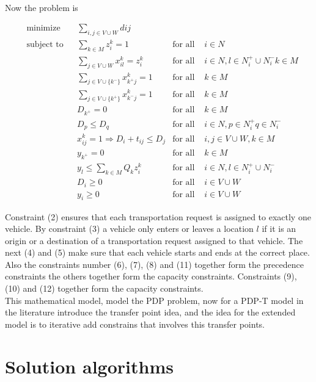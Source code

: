 \documentclass[10pt,twoside]{article}
\begin{document}
\citep{Parragh2008} \\

\vspace{1cm}
Now the problem is

\begin{align}
& {\text{minimize}}
& & \sum_{i,j\in V \cup W} dij && \\
& \text{subject to}
& & \sum_{k\in M} z_i^k = 1 & \text{for all }& i\in N \\
&&& \sum_{j\in V\cup W} x_{il}^k = z_{i}^k & \text{for all } &
    i \in N,l\in N^+_i\cup N_i^- k\in M\\
&&& \sum_{j\in V\cup\{k^-\}} x^k_{k^+ j} = 1 & \text{for all }& k\in M\\
&&& \sum_{j\in V\cup\{k^+\}} x^k_{k^- j} = 1 & \text{for all }& k\in M\\
&&& D_{k^+} = 0 & \text{for all }& k\in M\\
&&& D_p \leq D_q & \text{for all }& i\in N, p\in N_i^+ q\in N_i^-\\
&&& x_{ij}^k = 1\Rightarrow D_i + t_{ij} \leq D_j & \text{for all } &
    i,j \in V\cup W, k\in M\\
&&& y_{k^+} = 0 & \text{for all }& k\in M\\
&&& y_l \leq \sum_{k\in M} Q_kz_i^k & \text{for all } &
    i\in N, l\in N_i^+\cup N_i^-\\
&&& D_i \geq 0 & \text{for all }& i\in V\cup W\\
&&& y_i \geq 0 & \text{for all }& i\in V\cup W
\end{align}

Constraint (2) ensures that each transportation request is assigned to exactly
one vehicle. By constraint (3) a vehicle only enters or leaves a location $l$
if it is an origin or a destination of a transportation request assigned to that
vehicle. The next (4) and (5) make sure that each vehicle starts and ends at
the correct place. Also the constraints number (6), (7), (8) and (11) together
form the precedence constraints the others together form the capacity
constraints.  Constraints (9), (10) and (12) together form the capacity
 constraints.\\
This mathematical model, model the PDP problem, now for a PDP-T model in the
literature introduce the transfer point idea, and the idea for the extended
model is to iterative add constrains that involves this transfer points.


\section{Solution algorithms}\label{sec_alg}
\end{document}
